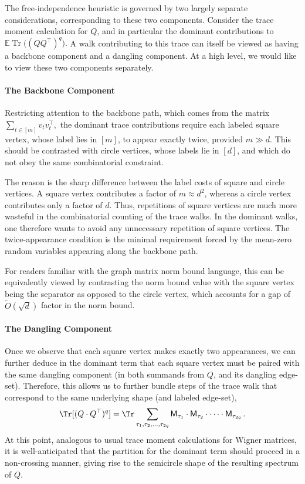 \documentclass[12pt]{article}
\newcommand{\cm}{\mathsf{M} }
\begin{document}
The free-independence heuristic is governed by two largely separate
considerations, corresponding to these two components. Consider the trace moment
calculation for \(Q\), and in particular the dominant contributions to
\(
    \mathbb E\operatorname{Tr}\bigl((QQ^\top)^q\bigr).
\)
A walk contributing to this trace can itself be viewed as having a backbone
component and a dangling component. At a high level, we would like to view these two
components separately.

\paragraph{The Backbone Component}
 Restricting attention to the backbone path, which comes from the matrix
    \(
        \sum_{t\in[m]} v_tv_t^\top,
    \)
    the dominant trace contributions require each labeled square vertex, whose
    label lies in \([m]\), to appear exactly twice, provided $m\gg d$. This should be contrasted
    with circle vertices, whose labels lie in \([d]\), and which do not obey the
    same combinatorial constraint.

    The reason is the sharp difference between the label costs of square and
    circle vertices. A square vertex contributes a factor of \(m\approx d^2\),
    whereas a circle vertex contributes only a factor of \(d\). Thus,
    repetitions of square vertices are much more wasteful in the combinatorial counting of the trace walks.
    In the dominant walks, one therefore wants to avoid any unnecessary
    repetition of square vertices. The twice-appearance condition is the minimal
    requirement forced by the mean-zero random variables appearing along the
    backbone path.
    
    
    For readers familiar with the graph matrix norm bound language, this can be equivalently viewed by contrasting the norm bound value with the square vertex being the separator as opposed to the circle vertex, which accounts for a gap of $\tilde{O}(\sqrt{d})$ factor in the norm bound.
    
    \paragraph{The Dangling Component} Once we observe that each square vertex makes exactly two appearances, we can further deduce in the dominant term that each square vertex must be paired with the same dangling component (in both summands from $Q$, and its dangling edge-set). Therefore, this allows us to further bundle steps of the trace walk that correspond to the same underlying shape (and labeled edge-set),  \[ 
    \Tr[(Q\cdot Q^\top )^{q}] =  \Tr \sum_{\tau_1,\tau_2,\dots,\tau_{2q}} \cm_{\tau_1} \cdot \cm_{\tau_2} \cdot \dots \cdot \cm_{\tau_{2q}}\,.
    \]
    At this point, analogous to usual trace moment calculations for Wigner matrices,  it is well-anticipated that the partition for the dominant term should proceed in a non-crossing manner, giving rise to the semicircle shape of the resulting spectrum of $Q$. 
    
\end{document}
